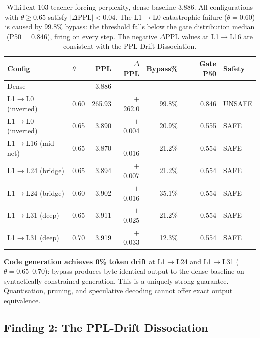 \documentclass{article}
\begin{document}
\begin{table}[htbp]
\centering
\setlength{\tabcolsep}{4pt}
\renewcommand{\arraystretch}{1.10}
\begin{tabular}{llrrrrl}
\toprule
\textbf{Config} & \textbf{$\theta$}
  & \textbf{PPL} & \textbf{$\Delta$PPL}
  & \textbf{Bypass\%} & \textbf{Gate P50} & \textbf{Safety} \\
\midrule
Dense & --- & 3.886 & --- & --- & --- & --- \\
\midrule
L1$\to$L0 (inverted) & 0.60 & 265.93 & $+$262.0 & 99.8\% & 0.846 & UNSAFE \\
L1$\to$L0 (inverted) & 0.65 & 3.890  & $+$0.004 & 20.9\% & 0.555 & SAFE \\
L1$\to$L16 (mid-net) & 0.65 & 3.870  & $-$0.016 & 21.2\% & 0.554 & SAFE \\
L1$\to$L24 (bridge)  & 0.65 & 3.894  & $+$0.007 & 21.2\% & 0.554 & SAFE \\
L1$\to$L24 (bridge)  & 0.60 & 3.902  & $+$0.016 & 35.1\% & 0.554 & SAFE \\
L1$\to$L31 (deep)    & 0.65 & 3.911  & $+$0.025 & 21.2\% & 0.554 & SAFE \\
L1$\to$L31 (deep)    & 0.70 & 3.919  & $+$0.033 & 12.3\% & 0.554 & SAFE \\
\bottomrule
\end{tabular}
\caption{WikiText-103 teacher-forcing perplexity, dense baseline 3.886.
All configurations with $\theta \geq 0.65$ satisfy $|\Delta\mathrm{PPL}| <
0.04$. The L1$\to$L0 catastrophic failure ($\theta = 0.60$) is caused by
99.8\% bypass: the threshold falls below the gate distribution median
(P50 = 0.846), firing on every step. The negative $\Delta$PPL values at
L1$\to$L16 are consistent with the PPL-Drift Dissociation.}
\label{tab:llm-ppl}
\end{table}

\textbf{Code generation achieves 0\% token drift} at L1$\to$L24 and
L1$\to$L31 ($\theta = 0.65$--$0.70$): bypass produces byte-identical
output to the dense baseline on syntactically constrained generation.
This is a uniquely strong guarantee. Quantisation, pruning, and
speculative decoding cannot offer exact output equivalence.

\subsection{Finding 2: The PPL-Drift Dissociation}
\label{sec:llm-drift}
\end{document}
